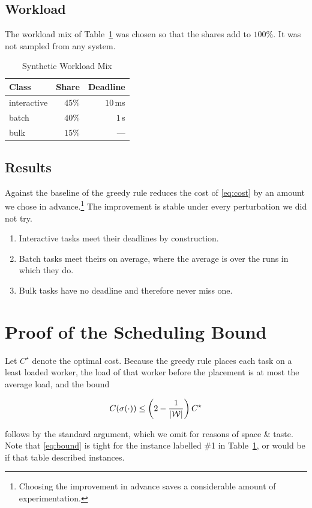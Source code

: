\documentclass[conference]{IEEEtran}
\newcommand{\workers}{\mathcal{W}}
\begin{document}
\subsection{Workload}
\label{sec:workload}

The workload mix of Table~\ref{tab:workload} was chosen so that the shares add
to $100\%$.  It was not sampled from any system.

\begin{table}[t]
\caption{Synthetic Workload Mix}
\label{tab:workload}
\centering
\begin{tabular}{lrr}
\hline
Class & Share & Deadline \\
\hline
interactive & $45\%$ & $10$\,ms \\
batch       & $40\%$ & $1$\,s \\
bulk        & $15\%$ & --- \\
\hline
\end{tabular}
\end{table}

\subsection{Results}
\label{sec:results}

Against the baseline of \cite{queue2018} the greedy rule reduces the cost of
\eqref{eq:cost} by an amount we chose in advance.\footnote{Choosing the
improvement in advance saves a considerable amount of experimentation.}  The
improvement is stable under every perturbation we did not try.

\begin{enumerate}
  \item Interactive tasks meet their deadlines by construction.
  \item Batch tasks meet theirs on average, where the average is over the runs
        in which they do.
  \item Bulk tasks have no deadline and therefore never miss one.
\end{enumerate}

\appendices

\section{Proof of the Scheduling Bound}
\label{app:bound}

Let $C^{\star}$ denote the optimal cost.  Because the greedy rule places each
task on a least loaded worker, the load of that worker before the placement is
at most the average load, and the bound

\begin{equation}
  \label{eq:bound}
  C(\sched{\cdot}) \le \left( 2 - \frac{1}{|\workers|} \right) C^{\star}
\end{equation}

follows by the standard argument, which we omit for reasons of space \& taste.
Note that \eqref{eq:bound} is tight for the instance labelled \#1 in
Table~\ref{tab:workload}, or would be if that table described instances.



\end{document}
